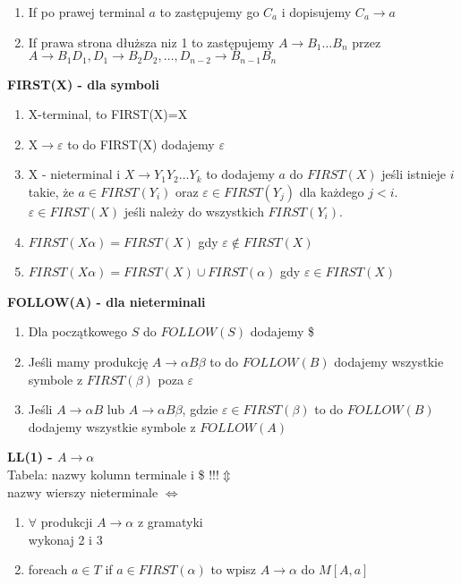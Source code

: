 \begin{multicols}{3}
\begin{enumerate}
      \item If po prawej terminal $a$ to zastępujemy go $C_{a}$ i dopisujemy $C_{a} \rightarrow a$
      \item If prawa strona dłuższa niz 1 to zastępujemy $A \rightarrow B_{1} \ldots B_{n}$ przez \\
    $A \rightarrow B_{1}D_{1}, D_{1} \rightarrow B_{2}D_{2}, \ldots ,D_{n-2} \rightarrow B_{n-1}B_{n}$
    \end{enumerate}
    \textbf{FIRST(X) - dla symboli}
    \begin{enumerate}
      \item X-terminal, to FIRST(X)={X}
      \item X$\rightarrow \varepsilon$ to do FIRST(X) dodajemy $\varepsilon$
      \item X - nieterminal i $X \rightarrow Y_{1}Y_{2}...Y_{k}$ to dodajemy $a$ do $FIRST(X)$ jeśli istnieje $i$ takie, że $a \in FIRST(Y_{i})$ oraz $\varepsilon \in FIRST(Y_{j})$ dla każdego $j<i$. \\ $\varepsilon \in FIRST(X)$ jeśli należy do wszystkich $FIRST(Y_{i})$. 
      \item $FIRST(X\alpha) = FIRST(X)$ gdy $\varepsilon \notin FIRST(X)$
      \item $FIRST(X\alpha) = FIRST(X) \cup FIRST(\alpha)$ gdy $\varepsilon \in FIRST(X)$
    \end{enumerate}
    \textbf{FOLLOW(A) - dla nieterminali}
    \begin{enumerate}
      \item Dla początkowego $S$ do $FOLLOW(S)$ dodajemy \$
      \item Jeśli mamy produkcję $A\rightarrow\alpha B \beta$ to do $FOLLOW(B)$ dodajemy wszystkie symbole z $FIRST(\beta)$ poza $\varepsilon$
      \item Jeśli $A\rightarrow\alpha B $ lub $A\rightarrow\alpha B \beta$, gdzie $\varepsilon \in FIRST(\beta)$ to do $FOLLOW(B)$ dodajemy wszystkie symbole z $FOLLOW(A)$
    \end{enumerate}
    \textbf{LL(1) - $A \rightarrow \alpha$} \\
    Tabela: nazwy kolumn terminale i \$ !!!$ \Updownarrow $ \\ nazwy wierszy nieterminale $ \Leftrightarrow $
    \begin{enumerate}
      \item $\forall$ produkcji $A\rightarrow \alpha$  z gramatyki \\ wykonaj 2 i 3
      \item foreach $a \in T$ if $a \in FIRST(\alpha)$ to wpisz $A\rightarrow \alpha$ do $M[A,a]$

\end{enumerate}
\end{multicols}
